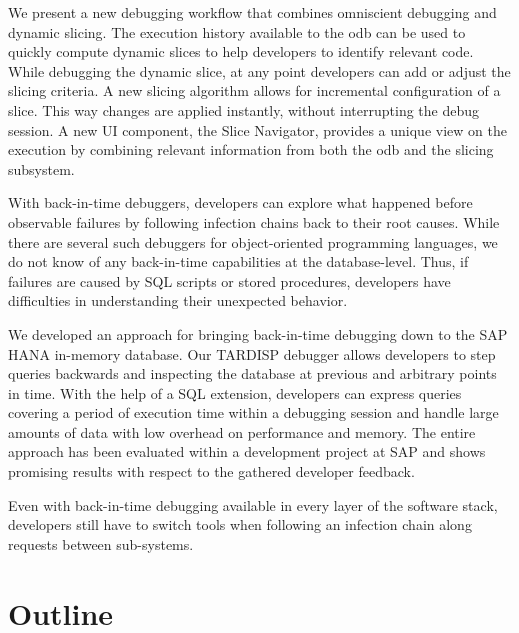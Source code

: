 We present a new debugging workflow that combines omniscient debugging and dynamic slicing. 
The execution history available to the \ac{odb} can be used to quickly compute dynamic slices to help developers to identify relevant code.
While debugging the dynamic slice, at any point developers can add or adjust the slicing criteria.
A new slicing algorithm allows for incremental configuration of a slice. 
This way changes are applied instantly, without interrupting the debug session. 
A new UI component, the Slice Navigator, provides a unique view on the execution by combining relevant information from both the \ac{odb} and the slicing subsystem.


With back-in-time debuggers, developers can explore what happened before observable failures by following infection chains back to their root causes. 
While there are several such debuggers for object-oriented programming languages, we do not know of any back-in-time capabilities at the database-level.
Thus, if failures are caused by SQL scripts or stored procedures, developers have difficulties in understanding their unexpected behavior.

We developed an approach for bringing back-in-time debugging down to the SAP HANA in-memory database.
Our TARDISP debugger allows developers to step queries backwards and inspecting the database at previous and arbitrary points in time. 
With the help of a SQL extension, developers can express queries covering a period of execution time within a debugging session and handle large amounts of data with low overhead on performance and memory. 
The entire approach has been evaluated within a development project at SAP and shows promising results with respect to the gathered developer feedback.


Even with back-in-time debugging available in every layer of the software stack, developers still have to switch tools when following an infection chain along requests between sub-systems.

\section{Outline}

